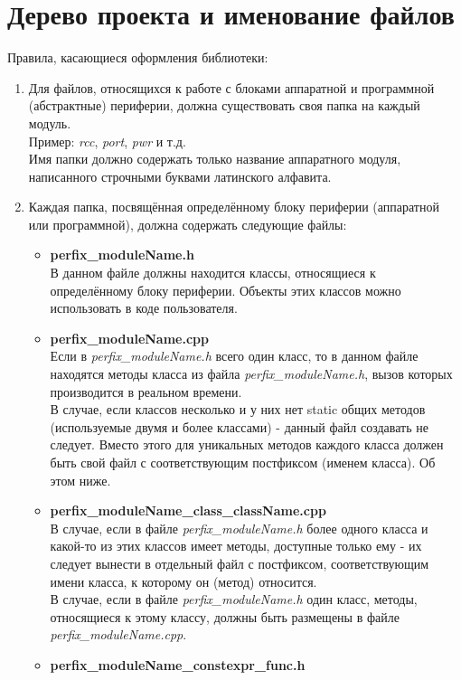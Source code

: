\section{Дерево проекта и именование файлов}\label{dn:0}
Правила, касающиеся оформления библиотеки:
\begin{enumerate}
	\item Для файлов, относящихся к работе с блоками аппаратной и программной (абстрактные) периферии, должна существовать своя папка на каждый модуль.\\
	Пример: \textit{rcc}, \textit{port}, \textit{pwr} и т.д.\\
	Имя папки должно содержать только название аппаратного модуля, написанного строчными буквами латинского алфавита.
	
	\item Каждая папка, посвящённая определённому блоку периферии (аппаратной или программной), должна содержать следующие файлы:
	\begin{itemize}
		\item \textbf{perfix\-\_module\-Name.h}\\
		В данном файле должны находится классы, относящиеся к определённому блоку периферии. Объекты этих классов можно использовать в коде пользователя.
		\item \textbf{perfix\-\_module\-Name.cpp}\\
		Если в \textit{perfix\_moduleName.h} всего один класс, то в данном файле находятся методы класса из файла \textit{perfix\_moduleName.h}, вызов которых производится в реальном времени.\\
		В случае, если классов несколько и у них нет static общих методов (используемые двумя и более классами) - данный файл создавать не следует. Вместо этого для уникальных методов каждого класса должен быть свой файл с соответствующим постфиксом (именем класса). Об этом ниже.
		\item \textbf{perfix\-\_moduleName\-\_class\-\_class\-Name.cpp}\\
		В случае, если в файле \textit{perfix\-\_moduleName.h} более одного класса и какой-то из этих классов имеет методы, доступные только ему - их следует вынести в отдельный файл с постфиксом, соответствующим имени класса, к которому он (метод) относится.\\
		В случае, если в файле \textit{perfix\-\_module\-Name.h} один класс, методы, относящиеся к этому классу, должны быть размещены в файле \textit{perfix\_\-moduleName.cpp}.
		\item \textbf{perfix\-\_module\-Name\-\_constexpr\-\_func.h}\\

\end{itemize}
\end{enumerate}
